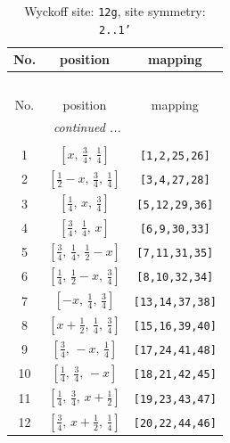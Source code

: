 \documentclass[fleqn,8pt]{jsarticle}
\begin{document}
\begin{longtable}{ccc}
\caption{Wyckoff site: {\tt 12g}, site symmetry: {\tt 2..1'}}
 \\
 \hline \hline
No. & position & mapping \\ \hline \endfirsthead

\multicolumn{2}{l}{\tablename\ \thetable{}} \\
 \hline \hline
No. & position & mapping \\ \hline \endhead

 \hline \hline
\multicolumn{2}{r}{\footnotesize\it continued ...} \\ \endfoot

 \hline \hline
\multicolumn{2}{r}{} \\ \endlastfoot

1 & $\left[ x,\, \frac{3}{4},\, \frac{1}{4} \right]$ & {\tt [1,2,25,26]} \\ \hline
2 & $\left[ \frac{1}{2} - x,\, \frac{3}{4},\, \frac{1}{4} \right]$ & {\tt [3,4,27,28]} \\ \hline
3 & $\left[ \frac{1}{4},\, x,\, \frac{3}{4} \right]$ & {\tt [5,12,29,36]} \\ \hline
4 & $\left[ \frac{3}{4},\, \frac{1}{4},\, x \right]$ & {\tt [6,9,30,33]} \\ \hline
5 & $\left[ \frac{3}{4},\, \frac{1}{4},\, \frac{1}{2} - x \right]$ & {\tt [7,11,31,35]} \\ \hline
6 & $\left[ \frac{1}{4},\, \frac{1}{2} - x,\, \frac{3}{4} \right]$ & {\tt [8,10,32,34]} \\ \hline
7 & $\left[ - x,\, \frac{1}{4},\, \frac{3}{4} \right]$ & {\tt [13,14,37,38]} \\ \hline
8 & $\left[ x + \frac{1}{2},\, \frac{1}{4},\, \frac{3}{4} \right]$ & {\tt [15,16,39,40]} \\ \hline
9 & $\left[ \frac{3}{4},\, - x,\, \frac{1}{4} \right]$ & {\tt [17,24,41,48]} \\ \hline
10 & $\left[ \frac{1}{4},\, \frac{3}{4},\, - x \right]$ & {\tt [18,21,42,45]} \\ \hline
11 & $\left[ \frac{1}{4},\, \frac{3}{4},\, x + \frac{1}{2} \right]$ & {\tt [19,23,43,47]} \\ \hline
12 & $\left[ \frac{3}{4},\, x + \frac{1}{2},\, \frac{1}{4} \right]$ & {\tt [20,22,44,46]} \\
\end{longtable}
\renewcommand{\arraystretch}{1.2}
\end{document}
